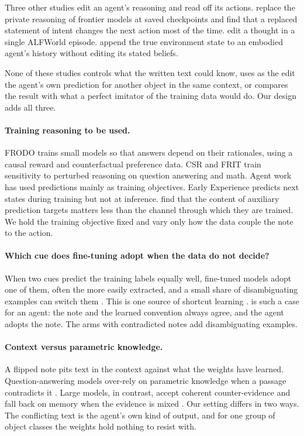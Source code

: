 Three other studies edit an agent's reasoning and read off its actions. \citet{sediqin2026loadbearing} replace the private reasoning of frontier models at saved checkpoints and find that a replaced statement of intent changes the next action most of the time. \citet{kim2025reflact} edit a thought in a single ALFWorld episode. \citet{wang2026evu} append the true environment state to an embodied agent's history without editing its stated beliefs.

None of these studies controls what the written text could know, uses as the edit the agent's own prediction for another object in the same context, or compares the result with what a perfect imitator of the training data would do. Our design adds all three.

\paragraph{Training reasoning to be used.}
FRODO \citep{paul2024frodo} trains small models so that answers depend on their rationales, using a causal reward and counterfactual preference data. CSR \citep{akter2025csr} and FRIT \citep{swaroop2025frit} train sensitivity to perturbed reasoning on question answering and math. Agent work has used predictions mainly as training objectives. Early Experience \citep{zhang2025earlyexperience} predicts next states during training but not at inference. \citet{wang2026darkroom} find that the content of auxiliary prediction targets matters less than the channel through which they are trained. We hold the training objective fixed and vary only how the data couple the note to the action.

\paragraph{Which cue does fine-tuning adopt when the data do not decide?}
When two cues predict the training labels equally well, fine-tuned models adopt one of them, often the more easily extracted, and a small share of disambiguating examples can switch them \citep{warstadt2020learning,lovering2021predicting}. This is one source of shortcut learning \citep{geirhos2020shortcut}.  is such a case for an agent: the note and the learned convention always agree, and the agent adopts the note. The arms with contradicted notes add disambiguating examples.

\paragraph{Context versus parametric knowledge.}
A flipped note pits text in the context against what the weights have learned. Question-answering models over-rely on parametric knowledge when a passage contradicts it \citep{longpre2021entity}. Large models, in contrast, accept coherent counter-evidence and fall back on memory when the evidence is mixed \citep{xie2024chameleon}. Our setting differs in two ways. The conflicting text is the agent's own kind of output, and for one group of object classes the weights hold nothing to resist with.

